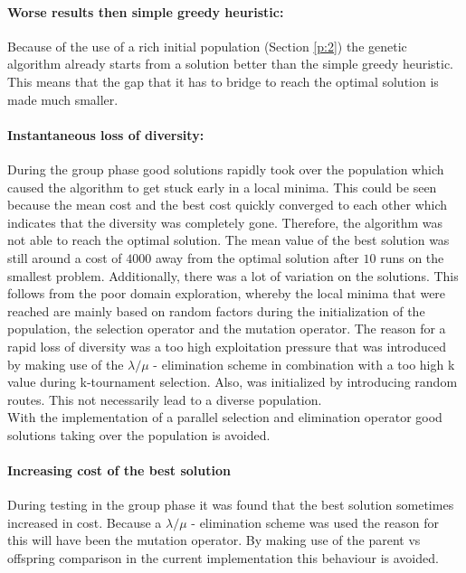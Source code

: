 \documentclass[a4paper,10pt]{article}
\begin{document}
\paragraph{Worse results then simple greedy heuristic:}Because of the use of a rich initial population (Section \ref{p:2}) the genetic algorithm already starts from a solution better than the simple greedy heuristic. This means that the gap that it has to bridge to reach the optimal solution is made much smaller.

\paragraph{Instantaneous loss of diversity:} During the group phase good solutions rapidly took over the population which caused the algorithm to get stuck early in a local minima. This could be seen because the mean cost and the best cost quickly converged to each other which indicates that the diversity was completely gone. Therefore, the algorithm was not able to reach the optimal solution. The mean value of the best solution was still around a cost of $4000$ away from the optimal solution after $10$ runs on the smallest problem. Additionally, there was a lot of variation on the solutions. This follows from the poor domain exploration, whereby the local minima that were reached are mainly based on random factors during the initialization of the population, the selection operator and the mutation operator. The reason for a rapid loss of diversity was a too high exploitation pressure that was introduced by making use of the $\lambda/\mu$ - elimination scheme in combination with a too high k value during k-tournament selection. Also, was initialized by introducing random routes. This not necessarily lead to a diverse population. \\
With the implementation of a parallel selection and elimination operator good solutions taking over the population is avoided. 

\paragraph{Increasing cost of the best solution} During testing in the group phase it was found that the best solution sometimes increased in cost. Because a $\lambda/\mu$ - elimination scheme was used the reason for this will have been the mutation operator. By making use of the parent vs offspring comparison in the current implementation this behaviour is avoided. 
\end{document}
